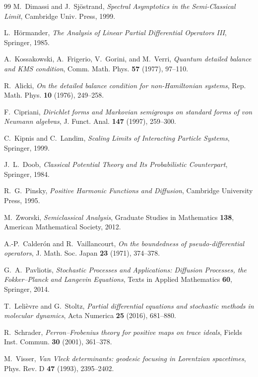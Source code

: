 \documentclass[11pt]{article}
\theoremstyle{definition}
\theoremstyle{remark}
\begin{document}
\begin{thebibliography}{99}
M.~Dimassi and J.~Sj\"ostrand, \emph{Spectral Asymptotics in the Semi-Classical
Limit}, Cambridge Univ. Press, 1999.

L.~H\"ormander, \emph{The Analysis of Linear Partial Differential Operators III},
Springer, 1985.

A.~Kossakowski, A.~Frigerio, V.~Gorini, and M.~Verri,
\emph{Quantum detailed balance and KMS condition},
Comm. Math. Phys. \textbf{57} (1977), 97--110.

R.~Alicki, \emph{On the detailed balance condition for non-Hamiltonian systems},
Rep. Math. Phys. \textbf{10} (1976), 249--258.

F.~Cipriani, \emph{Dirichlet forms and Markovian semigroups on standard forms of
von Neumann algebras}, J. Funct. Anal. \textbf{147} (1997), 259--300.

C.~Kipnis and C.~Landim, \emph{Scaling Limits of Interacting Particle Systems},
Springer, 1999.

J.~L.~Doob, \emph{Classical Potential Theory and Its Probabilistic Counterpart},
Springer, 1984.

R.~G.~Pinsky, \emph{Positive Harmonic Functions and Diffusion}, Cambridge
University Press, 1995.

M.~Zworski, \emph{Semiclassical Analysis}, Graduate Studies in Mathematics
\textbf{138}, American Mathematical Society, 2012.

A.-P.~Calder\'on and R.~Vaillancourt,
\emph{On the boundedness of pseudo-differential operators},
J. Math. Soc. Japan \textbf{23} (1971), 374--378.

G.~A.~Pavliotis, \emph{Stochastic Processes and Applications:
Diffusion Processes, the Fokker--Planck and Langevin Equations},
Texts in Applied Mathematics \textbf{60}, Springer, 2014.

T.~Leli\`evre and G.~Stoltz,
\emph{Partial differential equations and stochastic methods in molecular
dynamics}, Acta Numerica \textbf{25} (2016), 681--880.

R.~Schrader,
\emph{Perron--Frobenius theory for positive maps on trace ideals},
Fields Inst. Commun. \textbf{30} (2001), 361--378.

M.~Visser,
\emph{Van Vleck determinants: geodesic focusing in Lorentzian spacetimes},
Phys. Rev. D \textbf{47} (1993), 2395--2402.


\end{thebibliography}
\end{document}
